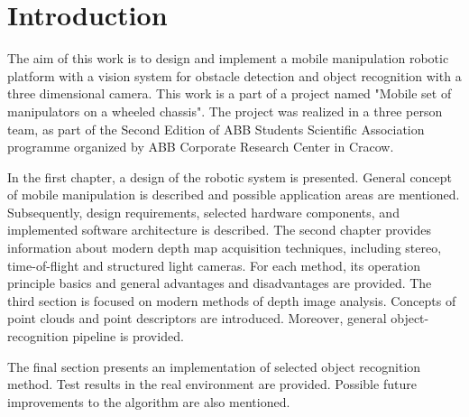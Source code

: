 \chapter*{Introduction}
\label{cha:introduction}



The aim of this work is to design and implement a mobile manipulation robotic platform with a vision system for obstacle detection and object recognition with a three dimensional camera. This work is a part of a project named "Mobile set of manipulators on a wheeled chassis". The project was realized in a three person team, as part of the Second Edition of ABB Students Scientific Association programme organized by ABB Corporate Research Center in Cracow.

	In the first chapter, a design of the robotic system is presented. General concept of mobile manipulation is described and possible application areas are mentioned. Subsequently, design requirements, selected hardware components, and implemented software architecture is described. The second chapter provides information about modern depth map acquisition techniques, including stereo, time-of-flight and structured light cameras. For each method, its operation principle basics and general advantages and disadvantages are provided. The third section is focused on modern methods of depth image analysis. Concepts of point clouds and point descriptors are introduced. Moreover, general object-recognition pipeline is provided.
	
	The final section presents an implementation of selected object recognition method. Test results in the real environment are provided. Possible future improvements to the algorithm are also mentioned.
	
\begin{comment}

Tematem pracy jest opis wybranych elementów składowych projektu o nazwie: Mobilny zespół manipulatorów na wspólnej platformie jezdnej. Projekt ten zrealizowany został w ramach Drugiej Edycji Koła Naukowego ABB we współpracy z Korporacyjnym Centrum Badawczym ABB w Krakowie. Zespół projektowy składał się z trzech osób pomiędzy które zostały podzielone zadania. Na tej podstawie zrealizowane zostały trzy prace dyplomowe inżynierskie. Niniejsza, związana z projektem mechanicznym, samodzielnym montażem wszystkich podzespołów oraz z analizą zagadnień kinematycznych zespołu dwóch skonstruowanych manipulatorów oraz dwie inne prace związane z oprogramowaniem operatorskim oraz z systemem akwizycji i przetwarzania danych. Projekt był realizowany w okresie od marca do listopada 2014 roku i jego główną częścią było uruchomienie zbudowanego urządzenia i jego prezentacja podczas uroczystego podsumowania.

\end{comment}









